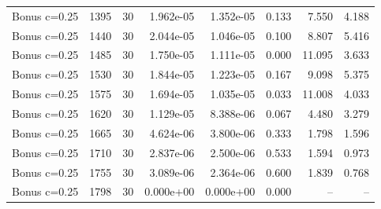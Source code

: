 \begin{scriptsize}
\begin{longtable}{llrrrrrr}
Bonus c=0.25 & 1395 & 30 & 1.962e-05 & 1.352e-05 & 0.133 & 7.550 & 4.188 \\
Bonus c=0.25 & 1440 & 30 & 2.044e-05 & 1.046e-05 & 0.100 & 8.807 & 5.416 \\
Bonus c=0.25 & 1485 & 30 & 1.750e-05 & 1.111e-05 & 0.000 & 11.095 & 3.633 \\
Bonus c=0.25 & 1530 & 30 & 1.844e-05 & 1.223e-05 & 0.167 & 9.098 & 5.375 \\
Bonus c=0.25 & 1575 & 30 & 1.694e-05 & 1.035e-05 & 0.033 & 11.008 & 4.033 \\
Bonus c=0.25 & 1620 & 30 & 1.129e-05 & 8.388e-06 & 0.067 & 4.480 & 3.279 \\
Bonus c=0.25 & 1665 & 30 & 4.624e-06 & 3.800e-06 & 0.333 & 1.798 & 1.596 \\
Bonus c=0.25 & 1710 & 30 & 2.837e-06 & 2.500e-06 & 0.533 & 1.594 & 0.973 \\
Bonus c=0.25 & 1755 & 30 & 3.089e-06 & 2.364e-06 & 0.600 & 1.839 & 0.768 \\
Bonus c=0.25 & 1798 & 30 & 0.000e+00 & 0.000e+00 & 0.000 & -- & -- \\
\bottomrule
\end{longtable}
\end{scriptsize}
